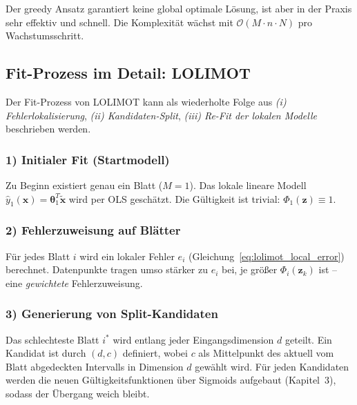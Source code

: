 \documentclass[11pt,a4paper]{report}
\begin{document}
\begin{hinweisbox}
Der greedy Ansatz garantiert keine global optimale L\"{o}sung, ist aber in der Praxis sehr
effektiv und schnell. Die Komplexit\"{a}t w\"{a}chst mit $\mathcal{O}(M \cdot n \cdot N)$
pro Wachstumsschritt.
\end{hinweisbox}

\subsection{Fit-Prozess im Detail: LOLIMOT}
\label{sec:lolimot_fit_process}

Der Fit-Prozess von LOLIMOT kann als wiederholte Folge aus \emph{(i) Fehlerlokalisierung},
\emph{(ii) Kandidaten-Split}, \emph{(iii) Re-Fit der lokalen Modelle} beschrieben werden.

\subsubsection{1) Initialer Fit (Startmodell)}
Zu Beginn existiert genau ein Blatt ($M=1$). Das lokale lineare Modell
$\hat{y}_1(\mathbf{x})=\boldsymbol{\theta}_1^T\tilde{\mathbf{x}}$ wird per OLS gesch\"{a}tzt.
Die G\"{u}ltigkeit ist trivial: $\Phi_1(\mathbf{z}) \equiv 1$.

\subsubsection{2) Fehlerzuweisung auf Bl\"{a}tter}
F\"{u}r jedes Blatt $i$ wird ein lokaler Fehler $e_i$
(Gleichung~\ref{eq:lolimot_local_error}) berechnet. Datenpunkte tragen umso st\"{a}rker
zu $e_i$ bei, je gr\"{o}\ss{}er $\Phi_i(\mathbf{z}_k)$ ist -- eine \emph{gewichtete}
Fehlerzuweisung.

\subsubsection{3) Generierung von Split-Kandidaten}
Das schlechteste Blatt $i^*$ wird entlang jeder Eingangsdimension $d$ geteilt.
Ein Kandidat ist durch $(d,c)$ definiert, wobei $c$ als Mittelpunkt des aktuell vom
Blatt abgedeckten Intervalls in Dimension $d$ gew\"{a}hlt wird.
F\"{u}r jeden Kandidaten werden die neuen G\"{u}ltigkeitsfunktionen \"{u}ber Sigmoids aufgebaut
(Kapitel~3), sodass der \"{U}bergang weich bleibt.
\end{document}
